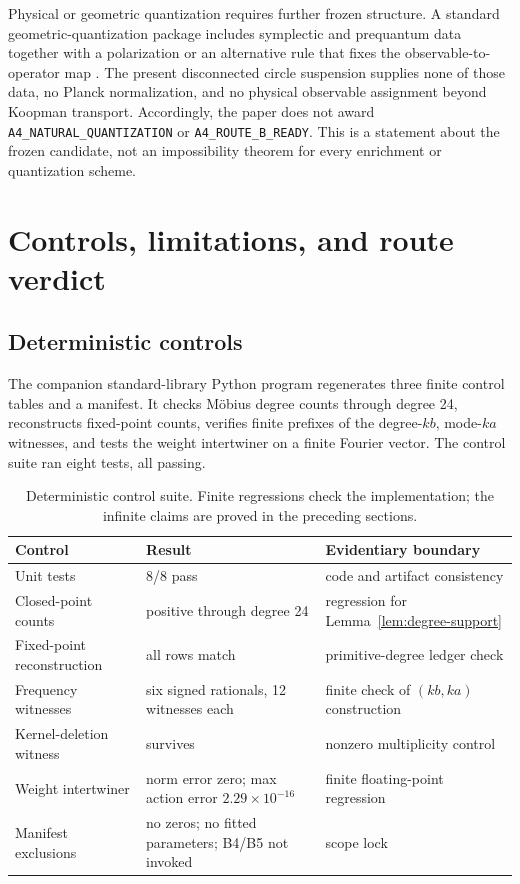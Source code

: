 \documentclass[11pt]{article}
\theoremstyle{definition}
\theoremstyle{remark}
\begin{document}
Physical or geometric quantization requires further frozen structure.  A
standard geometric-quantization package includes symplectic and prequantum
data together with a polarization or an alternative rule that fixes the
observable-to-operator map \citep{Kostant1970}.  The present disconnected
circle suspension supplies none of those data, no Planck normalization, and
no physical observable assignment beyond Koopman transport.  Accordingly,
the paper does not award \texttt{A4\_NATURAL\_QUANTIZATION} or
\texttt{A4\_ROUTE\_B\_READY}.  This is a statement about the frozen candidate,
not an impossibility theorem for every enrichment or quantization scheme.

\section{Controls, limitations, and route verdict}
\label{sec:controls}

\subsection{Deterministic controls}

The companion standard-library Python program regenerates three finite
control tables and a manifest.  It checks M\"obius degree counts through
degree 24, reconstructs fixed-point counts, verifies finite prefixes of the
degree-\(kb\), mode-\(ka\) witnesses, and tests the weight intertwiner on a
finite Fourier vector.  The control suite ran eight tests, all passing.

\begin{table}[t]
\centering
\caption{Deterministic control suite.  Finite regressions check the
implementation; the infinite claims are proved in the preceding sections.}
\label{tab:controls}
\small
\begin{tabularx}{\textwidth}{@{}p{}p{}Y@{}}
\toprule
Control & Result & Evidentiary boundary\\
\midrule
Unit tests & 8/8 pass & code and artifact consistency\\
Closed-point counts & positive through degree 24 & regression for Lemma~\ref{lem:degree-support}\\
Fixed-point reconstruction & all rows match & primitive-degree ledger check\\
Frequency witnesses & six signed rationals, 12 witnesses each & finite check of \((kb,ka)\) construction\\
Kernel-deletion witness & survives & nonzero multiplicity control\\
Weight intertwiner & norm error zero; max action error \(2.29\times10^{-16}\) & finite floating-point regression\\
Manifest exclusions & no zeros; no fitted parameters; B4/B5 not invoked & scope lock\\
\bottomrule
\end{tabularx}
\end{table}
\end{document}
